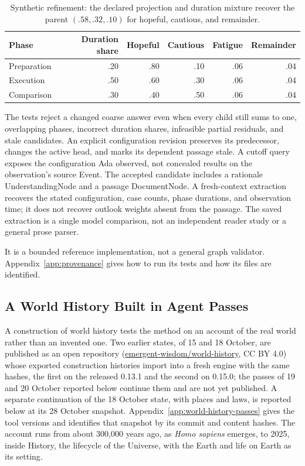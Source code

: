 \documentclass[11pt,a4paper]{article}
\begin{document}
\begin{table}[htbp]
\centering
\small
\begin{tabular}{lrrrrr}
\toprule
Phase & Duration share & Hopeful & Cautious & Fatigue & Remainder \\
\midrule
Preparation & .20 & .80 & .10 & .06 & .04 \\
Execution & .50 & .60 & .30 & .06 & .04 \\
Comparison & .30 & .40 & .50 & .06 & .04 \\
\bottomrule
\end{tabular}
\caption{Synthetic refinement: the declared projection and duration mixture
recover the parent $(.58,.32,.10)$ for hopeful, cautious, and remainder.}
\label{tab:reference-refinement}
\end{table}

The tests reject a changed coarse answer even when every child still sums to
one, overlapping phases, incorrect duration shares, infeasible partial
residuals, and stale candidates. An explicit configuration revision preserves
its predecessor, changes the active head, and marks its dependent passage
stale. A cutoff query exposes the configuration Ada observed, not concealed
results on the observation's source Event. The accepted candidate includes a
rationale UnderstandingNode and a passage DocumentNode. A fresh-context
extraction recovers the stated configuration, case counts, phase durations,
and observation time; it does not recover outlook weights absent from the
passage. The saved extraction is a single model comparison, not an independent
reader study or a general prose parser.

It is a bounded reference implementation, not a general graph validator.
Appendix~\ref{app:provenance} gives how to run its tests and how its files are
identified.

\subsection{A World History Built in Agent Passes}
\label{sec:world-history}

A construction of world history tests the method on an account of the real world
rather than an invented one. Two earlier states, of 15 and 18 October, are
published as an open repository
(\href{https://github.com/emergent-wisdom/world-history}{emergent-wisdom/world-history},
CC BY 4.0) whose exported construction histories import into a fresh engine
with the same hashes, the first on the released 0.13.1 and the second on
0.15.0; the passes of 19 and 20 October reported below continue them and are
not yet published. A separate continuation of the 18 October state, with places
and laws, is reported below at its 28 October snapshot.
Appendix~\ref{app:world-history-passes} gives the tool versions and identifies
that snapshot by its commit and content hashes. The
account runs from about 300,000 years ago, as \emph{Homo sapiens} emerges, to
2025, inside History, the lifecycle of the Universe, with the Earth and life on
Earth as its setting.
\end{document}
